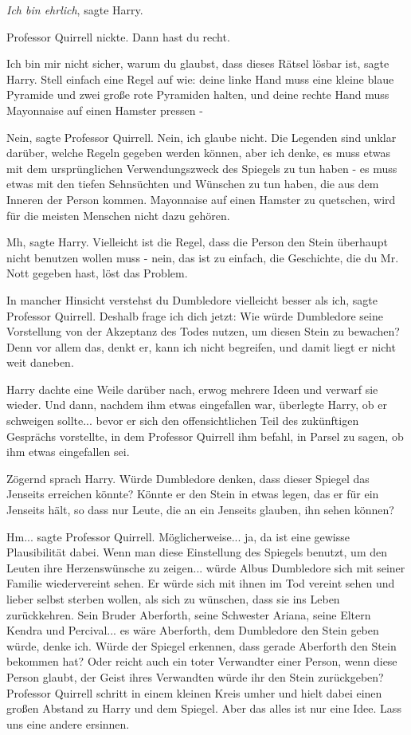 \glqq{}\emph{Ich bin ehrlich}\grqq{}, sagte Harry.

Professor Quirrell nickte. \glqq{}Dann hast du recht.\grqq{}

\glqq{}Ich bin mir nicht sicher, warum du glaubst, dass dieses Rätsel lösbar
ist\grqq{}, sagte Harry. \glqq{}Stell einfach eine Regel auf wie: deine linke
Hand muss eine kleine blaue Pyramide und zwei große rote Pyramiden halten, und
deine rechte Hand muss Mayonnaise auf einen Hamster pressen -\grqq{}

\glqq{}Nein\grqq{}, sagte Professor Quirrell. \glqq{}Nein, ich glaube nicht. Die
Legenden sind unklar darüber, welche Regeln gegeben werden können, aber ich
denke, es muss etwas mit dem ursprünglichen Verwendungszweck des Spiegels zu tun
haben - es muss etwas mit den tiefen Sehnsüchten und Wünschen zu tun haben, die
aus dem Inneren der Person kommen. Mayonnaise auf einen Hamster zu quetschen,
wird für die meisten Menschen nicht dazu gehören.\grqq{}

\glqq{}Mh\grqq{}, sagte Harry. \glqq{}Vielleicht ist die Regel, dass die Person
den Stein überhaupt nicht benutzen wollen muss - nein, das ist zu einfach, die
Geschichte, die du Mr. Nott gegeben hast, löst das Problem.\grqq{}

\glqq{}In mancher Hinsicht verstehst du Dumbledore vielleicht besser als
ich\grqq{}, sagte Professor Quirrell. \glqq{}Deshalb frage ich dich jetzt: Wie
würde Dumbledore seine Vorstellung von der Akzeptanz des Todes nutzen, um diesen
Stein zu bewachen? Denn vor allem das, denkt er, kann ich nicht begreifen, und
damit liegt er nicht weit daneben.\grqq{}

Harry dachte eine Weile darüber nach, erwog mehrere Ideen und verwarf sie
wieder. Und dann, nachdem ihm etwas eingefallen war, überlegte Harry, ob er
schweigen sollte... bevor er sich den offensichtlichen Teil des zukünftigen
Gesprächs vorstellte, in dem Professor Quirrell ihm befahl, in Parsel zu sagen,
ob ihm etwas eingefallen sei.

Zögernd sprach Harry. \glqq{}Würde Dumbledore denken, dass dieser Spiegel das
Jenseits erreichen könnte? Könnte er den Stein in etwas legen, das er für ein
Jenseits hält, so dass nur Leute, die an ein Jenseits glauben, ihn sehen
können?\grqq{}

\glqq{}Hm...\grqq{} sagte Professor Quirrell. \glqq{}Möglicherweise... ja, da ist
eine gewisse Plausibilität dabei. Wenn man diese Einstellung des Spiegels
benutzt, um den Leuten ihre Herzenswünsche zu zeigen... würde Albus Dumbledore
sich mit seiner Familie wiedervereint sehen. Er würde sich mit ihnen im Tod
vereint sehen und lieber selbst sterben wollen, als sich zu wünschen, dass sie
ins Leben zurückkehren. Sein Bruder Aberforth, seine Schwester Ariana, seine
Eltern Kendra und Percival... es wäre Aberforth, dem Dumbledore den Stein geben
würde, denke ich. Würde der Spiegel erkennen, dass gerade Aberforth den Stein
bekommen hat? Oder reicht auch ein toter Verwandter einer Person, wenn diese
Person glaubt, der Geist ihres Verwandten würde ihr den Stein
zurückgeben?\grqq{} Professor Quirrell schritt in einem kleinen Kreis umher und
hielt dabei einen großen Abstand zu Harry und dem Spiegel. \glqq{}Aber das alles
ist nur eine Idee. Lass uns eine andere ersinnen.\grqq{}

